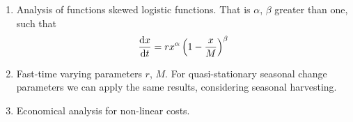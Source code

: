 \begin{enumerate}
\item Analysis of functions skewed logistic functions. That is $\alpha$, $\beta$ greater than one, such that 
\begin{equation}
	\frac{\mathrm{d} x}{{\mathrm{d} t}}=rx^\alpha\left(1-\frac{x}{M}\right)^\beta
\end{equation}

\item Fast-time varying parameters $r$, $M$. For quasi-stationary seasonal change parameters we can apply the same results, considering seasonal harvesting.

\item Economical analysis for non-linear costs.
\end{enumerate}